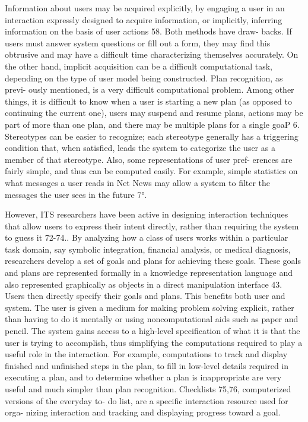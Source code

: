 Information about users may be acquired explicitly, by engaging a user in an interaction expressly designed to acquire information, or implicitly, inferring information on the basis of user actions 58. Both methods have draw- backs. If users must answer system questions or fill out a form, they may find this obtrusive and may have a difficult time characterizing themselves accurately. On the other hand, implicit acquisition can be a difficult computational task, depending on the type of user model being constructed. Plan recognition, as previ- ously mentioned, is a very difficult computational problem. Among other things, it is difficult to know when a user is starting a new plan (as opposed to continuing the current one), users may suspend and resume plans, actions may be part of more than one plan, and there may be multiple plans for a single goaP 6. Stereotypes can be easier to recognize; each stereotype generally has a triggering condition that, when satisfied, leads the system to categorize the user as a member of that stereotype. Also, some representations of user pref- erences are fairly simple, and thus can be computed easily. For example, simple statistics on what messages a user reads in Net News may allow a system to filter the messages the user sees in the future 7°.


However, ITS researchers have been active in designing interaction techniques that allow users to express their intent directly, rather than requiring the system to guess it 72-74.. By analyzing how a class of users works within a particular task domain, say symbolic integration, financial analysis, or medical diagnosis, researchers develop a set of goals and plans for achieving these goals. These goals and plans are represented formally in a knowledge representation language and also represented graphically as objects in a direct manipulation interface 43. Users then directly specify their goals and plans. This benefits both user and system. The user is given a medium for making problem solving explicit, rather than having to do it mentally or using noncomputational aids such as paper and pencil. The system gains access to a high-level specification of what it is that the user is trying to accomplish, thus simplifying the computations required to play a useful role in the interaction. For example, computations to track and display finished and unfinished steps in the plan, to fill in low-level details required in executing a plan, and to determine whether a plan is inappropriate are very useful and much simpler than plan recognition. Checklists 75,76, computerized versions of the everyday to- do list, are a specific interaction resource used for orga- nizing interaction and tracking and displaying progress toward a goal.

